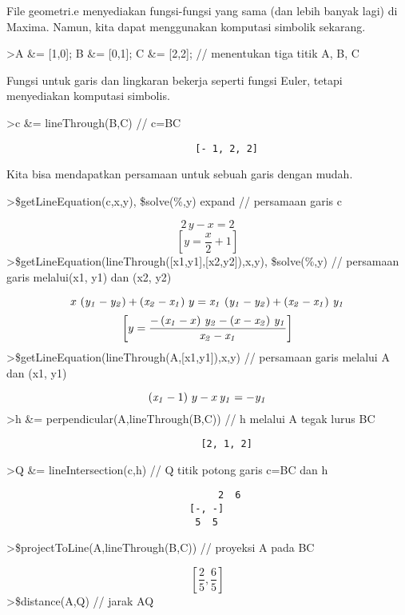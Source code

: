 \documentclass[
]{book}
\begin{document}
File geometri.e menyediakan fungsi-fungsi yang sama (dan lebih banyak lagi) di Maxima. Namun, kita dapat menggunakan komputasi simbolik sekarang.

\textgreater A \&= {[}1,0{]}; B \&= {[}0,1{]}; C \&= {[}2,2{]}; // menentukan tiga titik A, B, C

Fungsi untuk garis dan lingkaran bekerja seperti fungsi Euler, tetapi menyediakan komputasi simbolis.

\textgreater c \&= lineThrough(B,C) // c=BC

\begin{verbatim}
                                 [- 1, 2, 2]
\end{verbatim}

Kita bisa mendapatkan persamaan untuk sebuah garis dengan mudah.

\textgreater\$getLineEquation(c,x,y), \$solve(\%,y) \textbar{} expand // persamaan garis c

\[2\,y-x=2\]\[\left[ y=\frac{x}{2}+1 \right] \]\textgreater\$getLineEquation(lineThrough({[}x1,y1{]},{[}x2,y2{]}),x,y), \$solve(\%,y) // persamaan garis melalui(x1, y1) dan (x2, y2)

\[x\,\left({\it y_1}-{\it y_2}\right)+\left({\it x_2}-{\it x_1}
 \right)\,y={\it x_1}\,\left({\it y_1}-{\it y_2}\right)+\left(
 {\it x_2}-{\it x_1}\right)\,{\it y_1}\]\[\left[ y=\frac{-\left({\it x_1}-x\right)\,{\it y_2}-\left(x-
 {\it x_2}\right)\,{\it y_1}}{{\it x_2}-{\it x_1}} \right] \]\textgreater\$getLineEquation(lineThrough(A,{[}x1,y1{]}),x,y) // persamaan garis melalui A dan (x1, y1)

\[\left({\it x_1}-1\right)\,y-x\,{\it y_1}=-{\it y_1}\]\textgreater h \&= perpendicular(A,lineThrough(B,C)) // h melalui A tegak lurus BC

\begin{verbatim}
                                  [2, 1, 2]
\end{verbatim}

\textgreater Q \&= lineIntersection(c,h) // Q titik potong garis c=BC dan h

\begin{verbatim}
                                     2  6
                                [-, -]
                                 5  5
\end{verbatim}

\textgreater\$projectToLine(A,lineThrough(B,C)) // proyeksi A pada BC

\[\left[ \frac{2}{5} , \frac{6}{5} \right] \]\textgreater\$distance(A,Q) // jarak AQ
\end{document}
